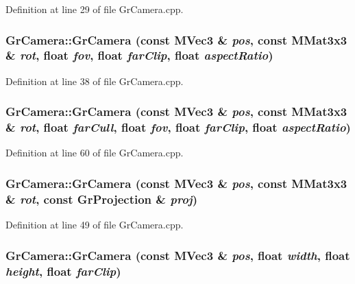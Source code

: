 Definition at line 29 of file GrCamera.cpp.\hypertarget{class_gr_camera_1dde80de1939b3d6c7b974688dcde414}{
\subsubsection[{GrCamera}]{\setlength{\rightskip}{0pt plus 5cm}GrCamera::GrCamera (const {\bf MVec3} \& {\em pos}, \/  const {\bf MMat3x3} \& {\em rot}, \/  float {\em fov}, \/  float {\em farClip}, \/  float {\em aspectRatio})}}
\label{class_gr_camera_1dde80de1939b3d6c7b974688dcde414}




Definition at line 38 of file GrCamera.cpp.\hypertarget{class_gr_camera_f2e9d46db59e3f9bdddcf2b07c76c3e3}{
\subsubsection[{GrCamera}]{\setlength{\rightskip}{0pt plus 5cm}GrCamera::GrCamera (const {\bf MVec3} \& {\em pos}, \/  const {\bf MMat3x3} \& {\em rot}, \/  float {\em farCull}, \/  float {\em fov}, \/  float {\em farClip}, \/  float {\em aspectRatio})}}
\label{class_gr_camera_f2e9d46db59e3f9bdddcf2b07c76c3e3}




Definition at line 60 of file GrCamera.cpp.\hypertarget{class_gr_camera_bc7e35d6d71f0dadd62220bf3e7d66a3}{
\subsubsection[{GrCamera}]{\setlength{\rightskip}{0pt plus 5cm}GrCamera::GrCamera (const {\bf MVec3} \& {\em pos}, \/  const {\bf MMat3x3} \& {\em rot}, \/  const {\bf GrProjection} \& {\em proj})}}
\label{class_gr_camera_bc7e35d6d71f0dadd62220bf3e7d66a3}




Definition at line 49 of file GrCamera.cpp.\hypertarget{class_gr_camera_c11424288ad427b92ea62aa4e55cf947}{
\subsubsection[{GrCamera}]{\setlength{\rightskip}{0pt plus 5cm}GrCamera::GrCamera (const {\bf MVec3} \& {\em pos}, \/  float {\em width}, \/  float {\em height}, \/  float {\em farClip})}}
\label{class_gr_camera_c11424288ad427b92ea62aa4e55cf947}




